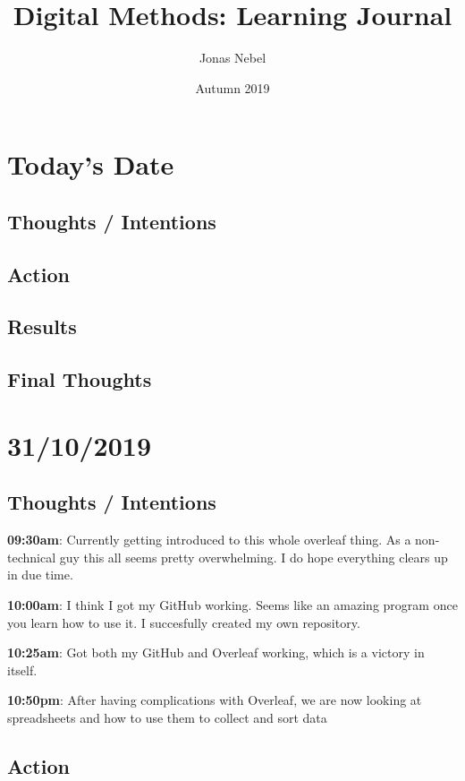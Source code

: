 \documentclass{article}
\title{Digital Methods: Learning Journal}
\author{Jonas Nebel}
\date{Autumn 2019}
\begin{document}
\maketitle

\section{Today's Date}
\subsection{Thoughts / Intentions}
\subsection{Action}
\subsection{Results}
\subsection{Final Thoughts}

\pagebreak{}

\section{31/10/2019}
\subsection{Thoughts / Intentions}

\textbf{09:30am}: Currently getting introduced to this whole overleaf thing. As a non-technical guy this all seems pretty overwhelming. I do hope everything clears up in due time. 


\textbf{10:00am}: I think I got my GitHub working. Seems like an amazing program once you learn how to use it. I succesfully created my own repository.


\textbf{10:25am}: Got both my GitHub and Overleaf working, which is a victory in itself.


\textbf{10:50pm}: After having complications with Overleaf, we are now looking at spreadsheets and how to use them to collect and sort data

\subsection{Action}
\end{document}
